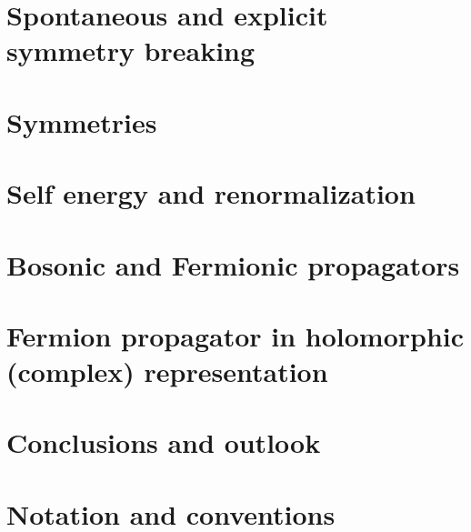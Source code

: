 \documentclass[a4paper, 12pt, openany]{book} %
\begin{document}
	

	
	
	\chapter{Spontaneous and explicit symmetry breaking}
	
	\chapter{Symmetries}
	
	
	\chapter{Self energy and renormalization}
	
	
	\chapter{Bosonic and Fermionic propagators}
	
	
	\chapter{Fermion propagator in holomorphic (complex) representation}
	\label{chap:bosonfermionpropagators}
	
	
	\chapter{Conclusions and outlook}
	
	

	\newpage
	\appendix
	
	\chapter{Notation and conventions}
	
	\fancyhf{} %
	\renewcommand{\headrulewidth}{0pt} %
	\fancyfoot[C]{\thepage} %
	
	\setcounter{page}{1}
	
	
	
	
	\newpage

	
	\printbibliography[title=References]
	
\end{document}
